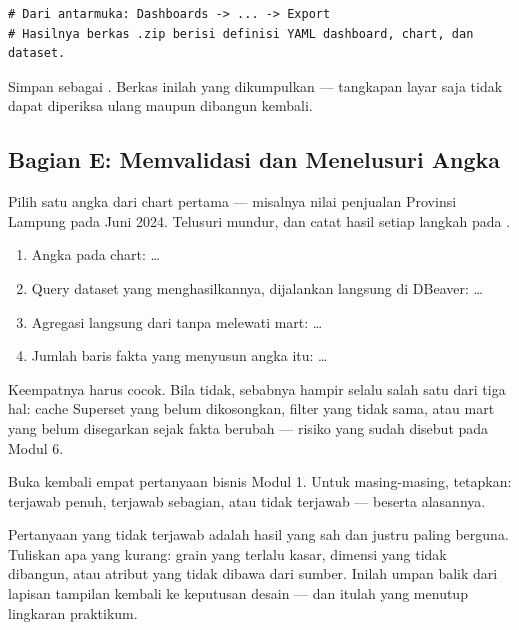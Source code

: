 
\begin{lstlisting}[style=shellgaya]
# Dari antarmuka: Dashboards -> ... -> Export
# Hasilnya berkas .zip berisi definisi YAML dashboard, chart, dan dataset.
\end{lstlisting}

Simpan sebagai . Berkas inilah yang dikumpulkan
--- tangkapan layar saja tidak dapat diperiksa ulang maupun dibangun kembali.

\subsection{Bagian E: Memvalidasi dan Menelusuri Angka}


Pilih satu angka dari chart pertama --- misalnya nilai penjualan Provinsi
Lampung pada Juni 2024. Telusuri mundur, dan catat hasil setiap langkah pada
.

\begin{enumerate}[leftmargin=1.4em]
  \item Angka pada chart: \ldots
  \item Query dataset yang menghasilkannya, dijalankan langsung di DBeaver:
        \ldots
  \item Agregasi langsung dari  tanpa
        melewati mart: \ldots
  \item Jumlah baris fakta yang menyusun angka itu: \ldots
\end{enumerate}

Keempatnya harus cocok. Bila tidak, sebabnya hampir selalu salah satu dari
tiga hal: cache Superset yang belum dikosongkan, filter yang tidak sama, atau
mart yang belum disegarkan sejak fakta berubah --- risiko yang sudah disebut
pada Modul 6.


Buka kembali empat pertanyaan bisnis Modul 1. Untuk masing-masing, tetapkan:
terjawab penuh, terjawab sebagian, atau tidak terjawab --- beserta alasannya.

\begin{catatan}
Pertanyaan yang tidak terjawab adalah hasil yang sah dan justru paling
berguna. Tuliskan apa yang kurang: grain yang terlalu kasar, dimensi yang tidak
dibangun, atau atribut yang tidak dibawa dari sumber. Inilah umpan balik dari
lapisan tampilan kembali ke keputusan desain --- dan itulah yang menutup
lingkaran praktikum.
\end{catatan}

